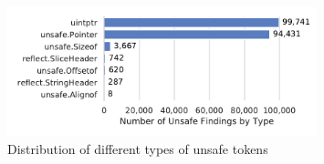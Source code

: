\begin{figure}[htp!]
    \centering
    \includegraphics[width=0.8\textwidth]{assets/plots/chapter4/distribution-unsafe-types.pdf}
    \caption{Distribution of different types of unsafe tokens}
    \label{fig:unsafe-tokens-distribution}
\end{figure}